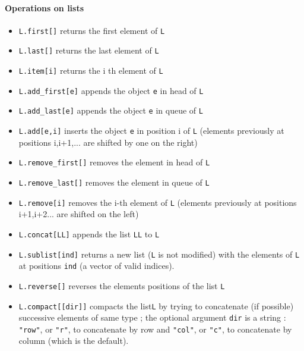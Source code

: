 \paragraph{Operations on lists}
\begin{itemize}
   \item \verb+L.first[]+ returns the first element of \verb+L+
   \item \verb+L.last[]+ returns the last element of \verb+L+
   \item \verb+L.item[i]+ returns the i th element of \verb+L+
   \item \verb+L.add_first[e]+ appends the object \verb+e+ in head of
   \verb+L+
   \item \verb+L.add_last[e]+ appends the object \verb+e+ in queue of \verb+L+
   \item \verb+L.add[e,i]+ inserts the object \verb+e+ in position i of
   \verb+L+ (elements previously at positions i,i+1,... 
             are shifted by one on the right)
   \item \verb+L.remove_first[]+ removes the element in head of \verb+L+
   \item \verb+L.remove_last[]+ removes the element in queue of \verb+L+
   \item \verb+L.remove[i]+ removes the i-th element of \verb+L+
      (elements previously at positions i+1,i+2... are shifted on the left)
   \item \verb+L.concat[LL]+ appends the list \verb+LL+ to \verb+L+
   \item \verb+L.sublist[ind]+ returns a new list (\verb+L+ is not
     modified) with the elements of \verb+L+ at positions \verb+ind+ 
   (a vector of valid indices).
   \item \verb+L.reverse[]+ reverses the elements positions of the
   list  \verb+L+
   \item \verb+L.compact[[dir]]+ compacts the list\verb+L+ by trying to concatenate
   (if possible) successive elements of same type ; the optional argument \verb+dir+
   is a string : \verb+"row"+, or \verb+"r"+, to concatenate by row
   and \verb+"col"+, or \verb+"c"+, to concatenate by
   column (which is the default). %
\end{itemize}

